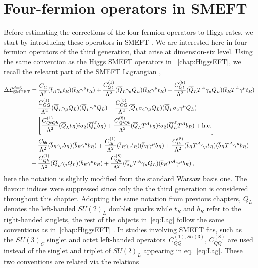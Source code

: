\section{Four-fermion operators in SMEFT \label{sec:notation}}
Before estimating the corrections of the four-fermion operators to Higgs rates, we start by introducing these operators in SMEFT .
We are interested here in  four-fermion operators of the third generation, that arise at dimension-six level. 
Using the same convention as the Higgs SMEFT operators in ~\autoref{chap:HiggsEFT}, we recall the relearnt part of the SMEFT Lagrangian \cite{Grzadkowski:2010es}, 
%
\begin{align}
	\Delta \mathcal{L}_{\mathrm{SMEFT}}^{d=6}&=\frac{C_{tt}}{\Lambda^2}(\overline{t}_R \gamma_{\mu} t_R)(\overline{t}_R \gamma^{\mu} t_R)+\frac{C_{Qt}^{(1)}}{\Lambda^2}(\overline{Q}_L \gamma_{\mu} Q_L)(\overline{t}_R \gamma^{\mu} t_R)+\frac{C_{Qt}^{(8)}}{\Lambda^2}(\overline{Q}_L T^A\gamma_{\mu} Q_L)(\overline{t}_R T^A\gamma^{\mu} t_R) \nonumber\\ \label{eq:Lag}
	&+\frac{C_{QQ}^{(1)}}{\Lambda^2}(\overline{Q}_L \gamma_{\mu} Q_L)(\overline{Q}_L \gamma^{\mu} Q_L)+\frac{C_{QQ}^{(3)}}{\Lambda^2}(\overline{Q}_L \sigma_a \gamma_{\mu} Q_L)(\overline{Q}_L  \sigma_a \gamma^{\mu} Q_L)\\ &+\left[\frac{C^{(1)}_{QtQb}}{\Lambda^2} (\overline{Q}_L t_R )i\sigma_2(\overline{Q}_L^\mathrm{ T} b_R) +\frac{C^{(8)}_{QtQb}}{\Lambda^2} (\overline{Q}_L T^A t_R) i\sigma_2 (\overline{Q}_L^{\mathrm {T}} T^A b_R) + \mathrm{h.c.} \right]\,\nonumber
	\\
	&+ \frac{C_{bb}}{\Lambda^2}(\overline{b}_R \gamma_{\mu} b_R)(\overline{b}_R \gamma^{\mu} b_R) +\frac{C_{tb}^{(1)}}{\Lambda^2}(\overline{t}_R \gamma_{\mu} t_R)(\overline{b}_R \gamma^{\mu} b_R)+\frac{C_{tb}^{(8)}}{\Lambda^2}(\overline{t}_R T^A\gamma_{\mu} t_R)(\overline{b}_R T^A\gamma^{\mu} b_R) \nonumber \\
	& +\frac{C_{Qb}^{(1)}}{\Lambda^2}(\overline{Q}_L \gamma_{\mu} Q_L)(\overline{b}_R \gamma^{\mu} b_R)+\frac{C_{Qb}^{(8)}}{\Lambda^2}(\overline{Q}_L T^A\gamma_{\mu} Q_L)(\overline{b}_R T^A\gamma^{\mu} b_R) \,,\nonumber
\end{align}
%
here the notation is slightly modified from the standard Warsaw basis one. The flavour indices were suppressed since only the the third generation is considered throughout this chapter. Adopting the same notation from previous chapters, $Q_L$ denotes the left-handed $SU(2)_L$ doublet quarks while  $t_R$ and $b_R$ refer to the right-handed singlets, the rest of the objects in~\eqref{eq:Lag} follow the same conventions as in~\autoref{chap:HiggsEFT} .  In studies involving SMEFT fits, such as ~\cite{Ethier:2021bye} the $SU(3)_C$ singlet and octet left-handed operators~$C_{QQ}^{(1),SU(3)},\,C_{QQ}^{(8)}$ are used instead of the singlet and triplet of $SU(2)_L$ appearing in eq.~\eqref{eq:Lag}. These two conventions are related via the relations
